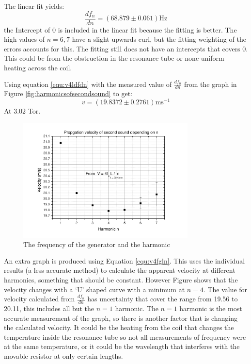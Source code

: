 The linear fit yields:
\begin{equation}
\boxed{\frac{df_n}{dn} = (68.879 \pm 0.061) \text{Hz}}
\end{equation}
the Intercept of 0 is included in the linear fit because the fitting is better.
The high values of $n = 6,7$ have a slight upwards curl, but the fitting weighting 
of the errors accounts for this.
The fitting still does not have an intercepts that covers 0.
This could be from the obstruction in the resonance tube or
none-uniform heating across the coil.

Using equation \ref{equ:v4ldfdn} with the measured value of $\frac{df_n}{dn}$ from the graph 
in Figure \ref{fig:harmonicsofsecondsound} to get:
\begin{equation}
\boxed{ v = (19.8372 \pm 0.2761) \text{ms}^{-1}}
\end{equation}
At 3.02 Tor.

\begin{figure}[htb]
\centering
\includegraphics[width=0.8\textwidth]{pics/velocitydependingonn.pdf}
\caption{The frequency of the generator and the harmonic\label{fig:velocitydependingonn}}
\end{figure}

An extra graph is produced using Equation \ref{equ:v4fgln}.
This uses the individual results (a less accurate method)
to calculate the apparent velocity at different harmonics,
something that should be constant.
However Figure \label{fig:velocitydependingonn} shows that 
the velocity changes with a `U' shaped curve with a minimum at 
$n=4$. The value for velocity calculated from $\frac{df_n}{dn}$
has uncertainty that cover the range from 19.56 to 20.11, this includes
all but the $n=1$ harmonic.
The $n=1$ harmonic is the most accurate measurement of the graph,
so there is another factor that is changing the calculated velocity.
It could be the heating from the coil that changes the temperature inside
the resonance tube so not all measurements of frequency were at the same
temperature, or it could be the wavelength that interferes with the
movable resistor at only certain lengths. 

